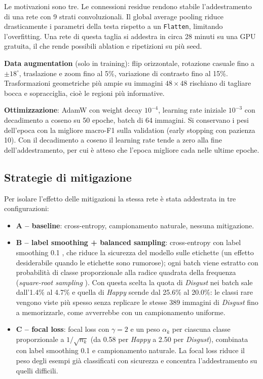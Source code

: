 \documentclass[11pt,a4paper]{article}
\begin{document}
Le motivazioni sono tre. Le connessioni residue rendono stabile l'addestramento di una rete con 9 strati convoluzionali. Il global average pooling riduce drasticamente i parametri della testa rispetto a un \texttt{Flatten}, limitando l'overfitting. Una rete di questa taglia si addestra in circa 28 minuti su una GPU gratuita, il che rende possibili ablation e ripetizioni su più seed.

\textbf{Data augmentation} (solo in training): flip orizzontale, rotazione casuale fino a $\pm18^\circ$, traslazione e zoom fino al 5\%, variazione di contrasto fino al 15\%. Trasformazioni geometriche più ampie su immagini $48\times48$ rischiano di tagliare bocca e sopracciglia, cioè le regioni più informative.

\textbf{Ottimizzazione}: AdamW con weight decay $10^{-4}$, learning rate iniziale $10^{-3}$ con decadimento a coseno su 50 epoche, batch di 64 immagini. Si conservano i pesi dell'epoca con la migliore macro-F1 sulla validation (early stopping con pazienza 10). Con il decadimento a coseno il learning rate tende a zero alla fine dell'addestramento, per cui è atteso che l'epoca migliore cada nelle ultime epoche.

\subsection{Strategie di mitigazione}
Per isolare l'effetto delle mitigazioni la stessa rete è stata addestrata in tre configurazioni:
\begin{itemize}
    \item \textbf{A -- baseline}: cross-entropy, campionamento naturale, nessuna mitigazione.
    \item \textbf{B -- label smoothing + balanced sampling}: cross-entropy con label smoothing 0.1 \cite{szegedy2016rethinking}, che riduce la sicurezza del modello sulle etichette (un effetto desiderabile quando le etichette sono rumorose); ogni batch viene estratto con probabilità di classe proporzionale alla radice quadrata della frequenza (\textit{square-root sampling} \cite{mahajan2018weakly}). Con questa scelta la quota di \textit{Disgust} nei batch sale dall'1.4\% al 4.7\% e quella di \textit{Happy} scende dal 25.6\% al 20.0\%: le classi rare vengono viste più spesso senza replicare le stesse 389 immagini di \textit{Disgust} fino a memorizzarle, come avverrebbe con un campionamento uniforme.
    \item \textbf{C -- focal loss}: focal loss \cite{lin2017focal} con $\gamma=2$ e un peso $\alpha_k$ per ciascuna classe proporzionale a $1/\sqrt{n_k}$ (da 0.58 per \textit{Happy} a 2.50 per \textit{Disgust}), combinata con label smoothing 0.1 e campionamento naturale. La focal loss riduce il peso degli esempi già classificati con sicurezza e concentra l'addestramento su quelli difficili.
\end{itemize}
\end{document}
